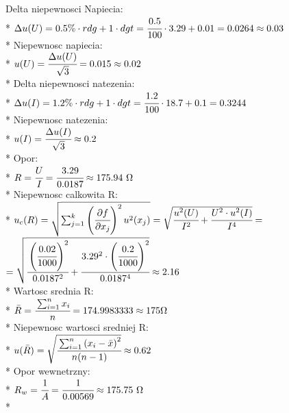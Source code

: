 \documentclass{article}
\begin{document}
\begin{center}
     Delta niepewnosci Napiecia:\\*
    $\Delta u(U)  = 0.5\% \cdot rdg+1 \cdot dgt=\cfrac{0.5}{100} \cdot 3.29 + 0.01=0.0264\approx0.03$\\*
    Niepewnosc napiecia:\\*
    $u(U)=\cfrac{\Delta u(U)}{\sqrt{3}}=0.015\approx0.02$\\*
    Delta niepewnosci natezenia:\\* 
    $\Delta u(I) = 1.2\% \cdot rdg+1 \cdot dgt = \cfrac{1.2}{100} \cdot 18.7 +0.1 =0.3244$\\*
    Niepewnosc natezenia:\\*
    $u(I)= \cfrac{\Delta u(I)}{\sqrt{3}} \approx 0.2$\\*
    Opor:\\* 
    $R=\cfrac{U}{I} = \cfrac{3.29}{0.0187} \approx 175.94 \ \Omega$\\*
    Niepewnosc calkowita R:\\*
    $u_c (R)=\sqrt{\sum_{j=1}^{k}\left( \cfrac{\partial f}{\partial x_j}\right)^2 u^2 (x_j)}
    =\sqrt{\cfrac{u^2 (U)}{I^2} + \cfrac{U^2 \cdot u^2 (I)}{I^4}}=$
    $= \sqrt{\cfrac{\left(\cfrac{0.02}{1000}\right)^2}{0.0187^2} + \cfrac{3.29^2 \cdot \left(\cfrac{0.2}{1000}\right)^2}{0.0187^4}}\approx 2.16$\\* 
    Wartosc srednia R:\\* 
    $\bar{R} = \cfrac{\sum_{i=1}^{n}x_i}{n}=174.9983333 \approx 175\Omega$\\*
    Niepewnosc wartosci sredniej R:\\ *
    $u(\bar{R}) = \sqrt{\cfrac{\sum_{i=1}^{n} \left(x_i - \bar{x} \right)^2}{n(n-1)}}\approx 0.62$\\*
    Opor wewnetrzny:\\* 
    $R_w =\cfrac{1}{A}=\cfrac{1}{0.00569} \approx 175.75 \ \Omega$\\*

\end{center}
\end{document}
